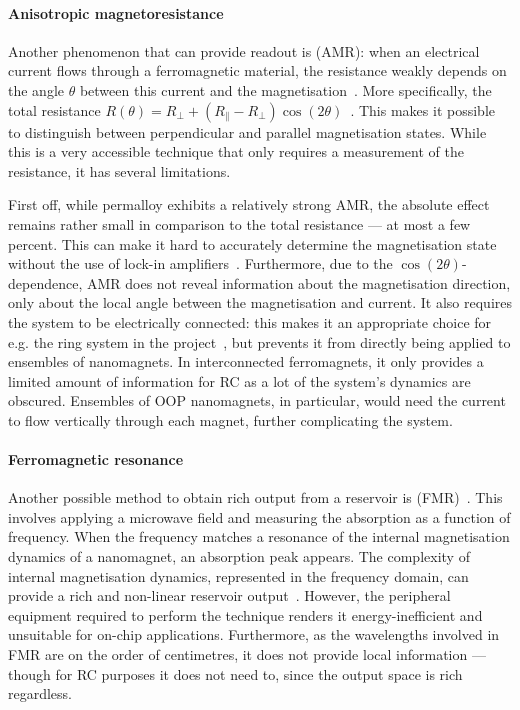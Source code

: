 \paragraph{Anisotropic magnetoresistance}
Another phenomenon that can provide readout is  (AMR): when an electrical current flows through a ferromagnetic material, the resistance weakly depends on the angle $\theta$ between this current and the magnetisation~\cite{AMR}.
More specifically, the total resistance $R(\theta) = R_\perp + (R_\parallel - R_\perp) \cos(2\theta)$~\cite{Hu2023}.
This makes it possible to distinguish between perpendicular and parallel magnetisation states.
While this is a very accessible technique that only requires a measurement of the resistance, it has several limitations. \par
First off, while permalloy exhibits a relatively strong AMR, the absolute effect remains rather small in comparison to the total resistance --- at most a few percent.
This can make it hard to accurately determine the magnetisation state without the use of lock-in amplifiers~\cite{ArchitecturesNanoringRC,Vidamour2023}.
Furthermore, due to the $\cos(2 \theta)$-dependence, AMR does not reveal information about the magnetisation direction, only about the local angle between the magnetisation and current.
It also requires the system to be electrically connected: this makes it an appropriate choice for e.g. the ring system in the \spinengine project~\cite{Vidamour2023,ArchitecturesNanoringRC,DynamicEmergence_NanomagneticSystem}, but prevents it from directly being applied to ensembles of nanomagnets.
In interconnected ferromagnets, it only provides a limited amount of information for RC as a lot of the system's dynamics are obscured.
Ensembles of OOP nanomagnets, in particular, would need the current to flow vertically through each magnet, further complicating the system.

\paragraph{Ferromagnetic resonance}
Another possible method to obtain rich output from a reservoir is  (FMR)~\cite{AdaptiveProgrammableRC,gartside2022reconfigurable}.
This involves applying a microwave field and measuring the absorption as a function of frequency.
When the frequency matches a resonance of the internal magnetisation dynamics of a nanomagnet, an absorption peak appears.
The complexity of internal magnetisation dynamics, represented in the frequency domain, can provide a rich and non-linear reservoir output~\cite{AdaptiveProgrammableRC,Gomez-Iriarte_FMR}.
However, the peripheral equipment required to perform the technique renders it energy-inefficient and unsuitable for on-chip applications.
Furthermore, as the wavelengths involved in FMR are on the order of centimetres, it does not provide local information --- though for RC purposes it does not need to, since the output space is rich regardless.

